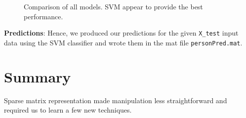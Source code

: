 \documentclass{article}
\begin{document}
   \begin{figure}[ht]
       \center
    	\hfill
	\caption{Comparison of all models. SVM appear to provide the best performance.}
  \end{figure}

  \textbf{Predictions}: Hence, we produced our predictions for the given \texttt{X\_test} input data using the SVM classifier and wrote them in the mat file \texttt{personPred.mat}.

\section{Summary}
  Sparse matrix representation made manipulation less straightforward and required us to learn a few new techniques.
\end{document}

